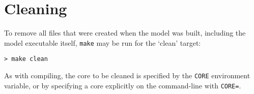 \section{Cleaning}

To remove all files  that were created when the model was built, including the model executable itself, {\tt make} may
be run for the `clean' target:

\vspace{12pt}
{\tt > make clean}
\vspace{12pt}

As with compiling, the core to be cleaned is specified by the {\tt CORE} environment variable, or by specifying a core explicitly on the command-line with {\tt CORE=}.

